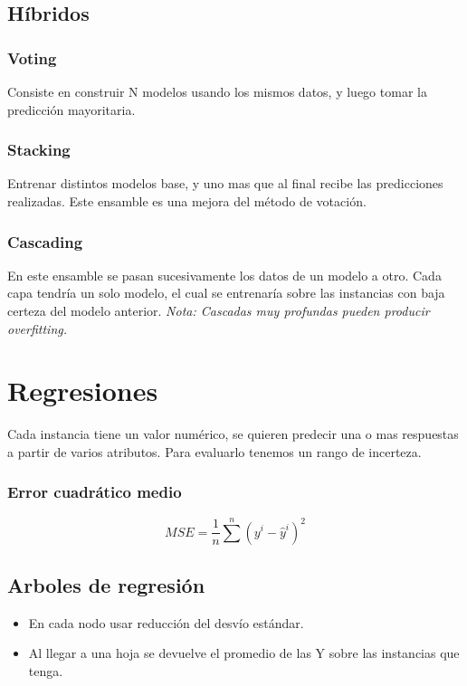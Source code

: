 \documentclass[titlepage,a4paper]{article}
\begin{document}
\subsection{Híbridos}
\subsubsection{Voting}
Consiste en construir N modelos usando los mismos datos, y luego tomar la predicción mayoritaria.


\subsubsection{Stacking}
Entrenar distintos modelos base, y uno mas que al final recibe las predicciones realizadas. Este ensamble es una mejora del método de votación.

\subsubsection{Cascading}
En este ensamble se pasan sucesivamente los datos de un modelo a otro. Cada capa tendría un solo modelo, el cual se entrenaría sobre las instancias con baja certeza del modelo anterior.
\textit{Nota: Cascadas muy profundas pueden producir overfitting.}

\section{Regresiones}

Cada instancia tiene un valor numérico, se quieren predecir una o mas respuestas a partir de varios atributos. Para evaluarlo tenemos un rango de incerteza.

\subsubsection*{Error cuadrático medio}
\begin{equation}
    MSE = \frac{1}{n} \sum^{n} (y^{i}-\hat{y}^{i})^{2}
\end{equation}

\subsection{Arboles de regresión}
\begin{itemize}
    \item En cada nodo usar reducción del desvío estándar.
    \item Al llegar a una hoja se devuelve el promedio de las Y sobre las instancias que tenga.
\end{itemize}
\end{document}
